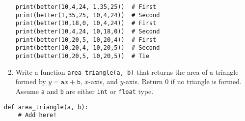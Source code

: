\documentclass[../main.tex]{subfiles}
\begin{document}
\begin{enumerate}
\begin{verbatim}
print(better(10,4,24, 1,35,25))  # First
print(better(1,35,25, 10,4,24))  # Second
print(better(10,18,0, 10,4,24))  # First
print(better(10,4,24, 10,18,0))  # Second
print(better(10,20,5, 10,20,4))  # First
print(better(10,20,4, 10,20,5))  # Second
print(better(10,20,5, 10,20,5))  # Tie
\end{verbatim}

\item Write a function \texttt{area\_triangle(a, b)} that returns the area of a
  triangle formed by $y = \texttt{a}x + \texttt{b}$, $x$-axis, and $y$-axis.
  Return 0 if no triangle is formed. Assume \texttt{a} and \texttt{b} are
  either \texttt{int} or \texttt{float} type.
\end{enumerate}
\begin{verbatim}
def area_triangle(a, b):
    # Add here!

\end{verbatim}
\end{document}
